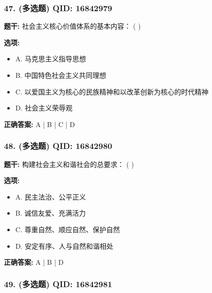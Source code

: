 \documentclass[12pt,UTF8]{ctexart}
\begin{document}
\subsubsection*{47. (多选题) \small QID: 16842979}

\textbf{题干:}
社会主义核心价值体系的基本内容： ( )

\textbf{选项:}
\begin{itemize}[leftmargin=*]

  \item A. 马克思主义指导思想

  \item B. 中国特色社会主义共同理想

  \item C. 以爱国主义为核心的民族精神和以改革创新为核心的时代精神

  \item D. 社会主义荣辱观

\end{itemize}

\textbf{正确答案:}
A | B | C | D

\vspace{0.3em}\hrulefill\vspace{0.7em}

\subsubsection*{48. (多选题) \small QID: 16842980}

\textbf{题干:}
构建社会主义和谐社会的总要求： ( )

\textbf{选项:}
\begin{itemize}[leftmargin=*]

  \item A. 民主法治、公平正义

  \item B. 诚信友爱、充满活力

  \item C. 尊重自然、顺应自然、保护自然

  \item D. 安定有序、人与自然和谐相处

\end{itemize}

\textbf{正确答案:}
A | B | D

\vspace{0.3em}\hrulefill\vspace{0.7em}

\subsubsection*{49. (多选题) \small QID: 16842981}
\end{document}

